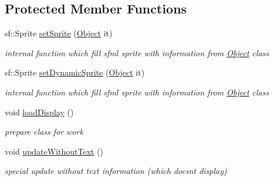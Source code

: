 \subsection*{Protected Member Functions}
\begin{DoxyCompactItemize}
\item 
sf\+::\+Sprite \hyperlink{class_display_aadebd92927d32d9766bc2d7bfff272f3}{set\+Sprite} (\hyperlink{class_object}{Object} it)
\begin{DoxyCompactList}\small\item\em internal function which fill sfml sprite with information from \hyperlink{class_object}{Object} class \end{DoxyCompactList}\item 
sf\+::\+Sprite \hyperlink{class_display_ad7ab55961c0e45e5f4f3caddd9359b1b}{set\+Dynamic\+Sprite} (\hyperlink{class_object}{Object} it)
\begin{DoxyCompactList}\small\item\em internal function which fill sfml sprite with information from \hyperlink{class_object}{Object} class \end{DoxyCompactList}\item 
\mbox{\label{class_display_ad0ff309e86415292e5b62e28ee658407}} 
void \hyperlink{class_display_ad0ff309e86415292e5b62e28ee658407}{load\+Display} ()
\begin{DoxyCompactList}\small\item\em prepare class for work \end{DoxyCompactList}\item 
\mbox{\label{class_display_a316e10fdc05529ec6d73f6a82aedbf3a}} 
void \hyperlink{class_display_a316e10fdc05529ec6d73f6a82aedbf3a}{update\+Without\+Text} ()
\begin{DoxyCompactList}\small\item\em special update without text information (which doesn\textquotesingle{}t display) \end{DoxyCompactList}\end{DoxyCompactItemize}
